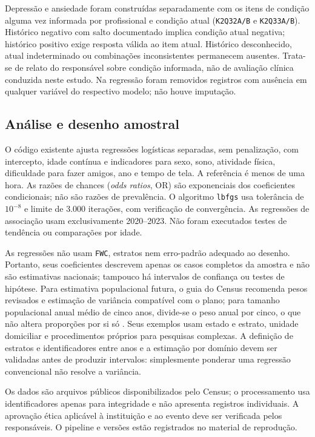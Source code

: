 ﻿\documentclass[12pt]{article}
\begin{document}
Depressão e ansiedade foram construídas separadamente com os itens de condição alguma vez informada por profissional e condição atual (\texttt{K2Q32A/B} e \texttt{K2Q33A/B}). Histórico negativo com salto documentado implica condição atual negativa; histórico positivo exige resposta válida ao item atual. Histórico desconhecido, atual indeterminado ou combinações inconsistentes permanecem ausentes. Trata-se de relato do responsável sobre condição informada, não de avaliação clínica conduzida neste estudo. Na regressão foram removidos registros com ausência em qualquer variável do respectivo modelo; não houve imputação.

\subsection{Análise e desenho amostral}
O código existente ajusta regressões logísticas separadas, sem penalização, com intercepto, idade contínua e indicadores para sexo, sono, atividade física, dificuldade para fazer amigos, ano e tempo de tela. A referência é menos de uma hora. As razões de chances (\textit{odds ratios}, OR) são exponenciais dos coeficientes condicionais; não são razões de prevalência. O algoritmo \texttt{lbfgs} usa tolerância de $10^{-8}$ e limite de 3.000 iterações, com verificação de convergência. As regressões de associação usam exclusivamente 2020--2023. Não foram executados testes de tendência ou comparações por idade.

As regressões não usam \texttt{FWC}, estratos nem erro-padrão adequado ao desenho. Portanto, seus coeficientes descrevem apenas os casos completos da amostra e não são estimativas nacionais; tampouco há intervalos de confiança ou testes de hipótese. Para estimativa populacional futura, o guia do Census recomenda pesos revisados e estimação de variância compatível com o plano; para tamanho populacional anual médio de cinco anos, divide-se o peso anual por cinco, o que não altera proporções por si só \cite{censusguide}. Seus exemplos usam estado e estrato, unidade domiciliar e procedimentos próprios para pesquisas complexas. A definição de estratos e identificadores entre anos e a estimação por domínio devem ser validadas antes de produzir intervalos: simplesmente ponderar uma regressão convencional não resolve a variância.

Os dados são arquivos públicos disponibilizados pelo Census; o processamento usa identificadores apenas para integridade e não apresenta registros individuais. A aprovação ética aplicável à instituição e ao evento deve ser verificada pelos responsáveis. O pipeline e versões estão registrados no material de reprodução.
\end{document}
